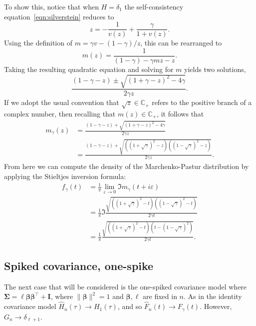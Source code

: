\documentclass{article}
\newcommand{\bbeta}{\boldsymbol{\beta}}
\newcommand{\bSigma}{\boldsymbol{\Sigma}}
\newcommand{\bI}{\boldsymbol{I}}
\begin{document}
To show this, notice that when $H = \delta_1$ the self-consistency equation~\eqref{eqn:silverstein} reduces to
$$
z = -\frac{1}{v(z)} + \frac{\gamma}{1 + v(z)}.
$$
Using the definition of $m = \gamma v - (1 - \gamma)/z$, this can be rearranged to 
$$
m(z)= \frac{1}{(1 - \gamma) - \gamma m z - z}.
$$
Taking the resulting quadratic equation and solving for $m$ yields two solutions, 
$$
\frac{(1 - \gamma - z) \pm \sqrt{(1 + \gamma - z)^2 - 4 \gamma}}{2 \gamma z}.
$$
If we adopt the usual convention that $\sqrt{z} \in \mathbb{C}_{+}$ refers to the positive branch of a complex number, then recalling that $m(z) \in \mathbb{C}_{+}$, it follows that 
\begin{align*}
m_{\gamma}(z) 
& = \frac{(1 - \gamma - z) + \sqrt{(1 + \gamma - z)^2 - 4 \gamma}}{2 \gamma z} \\
& = \frac{(1 - \gamma - z) + \sqrt{( (1 + \sqrt{\gamma})^2 - z)((1 - \sqrt{\gamma})^2 - z)}}{2 \gamma z}.
\end{align*}
From here we can compute the density of the Marchenko-Pastur distribution by applying the Stieltjes inversion formula:
\begin{align*}
f_{\gamma}(t) 
& = \frac{1}{\pi}\lim_{\varepsilon \to 0} \Im m_{\gamma}(t + i \varepsilon) \\
& = \frac{1}{\pi} \Im \frac{\sqrt{( (1 + \sqrt{\gamma})^2 - t)((1 - \sqrt{\gamma})^2 - t)}}{2 \gamma t} \\
& = \frac{1}{\pi} \frac{\sqrt{( (1 + \sqrt{\gamma})^2 - t)(t - (1 - \sqrt{\gamma})^2)}}{2 \gamma t}.
\end{align*}

\subsection{Spiked covariance, one-spike}
The next case that will be considered is the one-spiked covariance model where $\bSigma = \ell \bbeta \bbeta^{\top} + \bI$, where $\|\bbeta\|^2 = 1$ and $\bbeta, \ell$ are fixed in $n$. As in the identity covariance model $\hat{H}_n(\tau) \to H_1(\tau)$, and so $\hat{F}_n(t) \to F_{\gamma}(t)$. However, $G_n \to \delta_{\ell + 1}$.  


	
	
\end{document}
